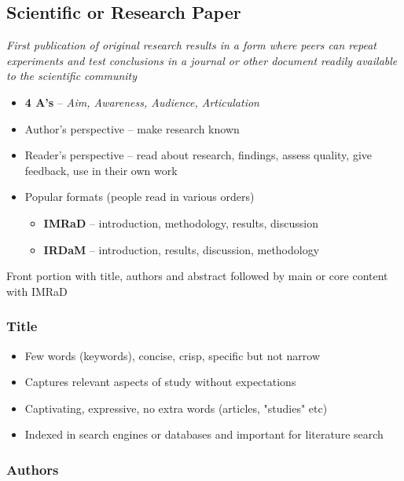 \documentclass{article}
\begin{document}
\subsection{Scientific or Research Paper}

\textit{First publication of original research results in a form where peers can repeat experiments and test conclusions in a journal or other document readily available to the scientific community}

\begin{itemize}
    \item \textbf{4 A's} -- \textit{Aim, Awareness, Audience, Articulation}
    \item Author's perspective -- make research known
    \item Reader's perspective -- read about research, findings, assess quality, give feedback, use in their own work
    \item Popular formats (people read in various orders)
    \begin{itemize}
        \item \textbf{IMRaD} -- introduction, methodology, results, discussion
        \item \textbf{IRDaM} -- introduction, results, discussion, methodology
    \end{itemize}
\end{itemize}

Front portion with title, authors and abstract followed by main or core content with IMRaD

\subsubsection{Title}

\begin{itemize}
    \item Few words (keywords), concise, crisp, specific but not narrow
    \item Captures relevant aspects of study without expectations
    \item Captivating, expressive, no extra words (articles, "studies" etc)
    \item Indexed in search engines or databases and important for literature search
\end{itemize}

\subsubsection{Authors}
\end{document}
